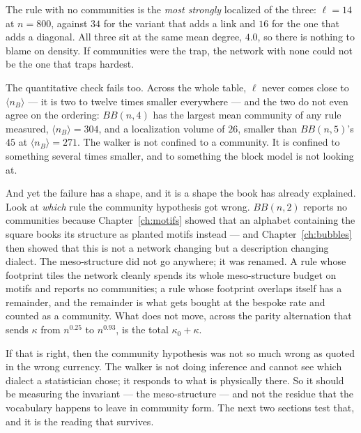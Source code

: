 The rule with no communities is the \emph{most strongly} localized of the three:
$\ell=14$ at $n=800$, against $34$ for the variant that adds a link and $16$ for the
one that adds a diagonal. All three sit at the same mean degree, $4.0$, so there is
nothing to blame on density. If communities were the trap, the network with none
could not be the one that traps hardest.

The quantitative check fails too. Across the whole table, $\ell$ never comes close to
$\langle n_B\rangle$ --- it is two to twelve times smaller everywhere --- and the two
do not even agree on the ordering: $BB(n,4)$ has the largest mean community of any
rule measured, $\langle n_B\rangle=304$, and a localization volume of $26$, smaller
than $BB(n,5)$'s $45$ at $\langle n_B\rangle=271$. The walker is not confined to a
community. It is confined to something several times smaller, and to something the
block model is not looking at.

And yet the failure has a shape, and it is a shape the book has already explained.
Look at \emph{which} rule the community hypothesis got wrong. $BB(n,2)$ reports no
communities because Chapter~\ref{ch:motifs} showed that an alphabet containing the
square books its structure as planted motifs instead --- and
Chapter~\ref{ch:bubbles} then showed that this is not a network changing but a
description changing dialect. The meso-structure did not go anywhere; it was
renamed. A rule whose footprint tiles the network cleanly spends its whole
meso-structure budget on motifs and reports no communities; a rule whose footprint
overlaps itself has a remainder, and the remainder is what gets bought at the
bespoke rate and counted as a community. What does not move, across the parity
alternation that sends $\kappa$ from $n^{0.25}$ to $n^{0.93}$, is the total
$\kappa_0+\kappa$.

If that is right, then the community hypothesis was not so much wrong as quoted in
the wrong currency. The walker is not doing inference and cannot see which dialect a
statistician chose; it responds to what is physically there. So it should be
measuring the invariant --- the meso-structure --- and not the residue that the
vocabulary happens to leave in community form. The next two sections test that, and
it is the reading that survives.

